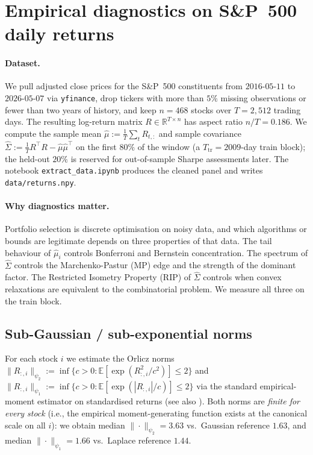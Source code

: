 
\section{Empirical diagnostics on S\&P~500 daily returns}\label{sec:diagnostics}

\paragraph{Dataset.} We pull adjusted close prices for the S\&P~500 constituents from
$2016$-$05$-$11$ to $2026$-$05$-$07$ via \texttt{yfinance}, drop tickers with more than
$5\%$ missing observations or fewer than two years of history, and keep $n=468$ stocks
over $T=2{,}512$ trading days. The resulting log-return matrix $R\in\mathbb R^{T\times n}$ has aspect
ratio $n/T=0.186$. We compute the sample mean $\hat\mu := \tfrac1T\sum_t R_{t,:}$ and
sample covariance $\hat\Sigma := \tfrac1T R^\top R - \hat\mu\hat\mu^\top$ on the first
$80\%$ of the window (a $T_{\mathrm{tr}}=2009$-day train block); the held-out $20\%$ is reserved
for out-of-sample Sharpe assessments later. The notebook \texttt{extract\_data.ipynb} produces
the cleaned panel and writes \texttt{data/returns.npy}.

\paragraph{Why diagnostics matter.} Portfolio selection is discrete optimisation on
noisy data, and which algorithms or bounds are legitimate depends on three properties
of that data. The tail behaviour of $\hat\mu_i$ controls Bonferroni and Bernstein
concentration. The spectrum of $\hat\Sigma$ controls the Marchenko-Pastur (MP) edge and
the strength of the dominant factor. The Restricted Isometry Property (RIP) of
$\hat\Sigma$ controls when convex relaxations are equivalent to the combinatorial
problem. We measure all three on the train block.

\subsection{Sub-Gaussian / sub-exponential norms}\label{ssec:psi}

For each stock $i$ we estimate the Orlicz norms
$\|R_{:,i}\|_{\psi_2} := \inf\{c>0: \mathbb E[\exp(R_{:,i}^2/c^2)]\le 2\}$ and
$\|R_{:,i}\|_{\psi_1} := \inf\{c>0: \mathbb E[\exp(|R_{:,i}|/c)]\le 2\}$ via the standard
empirical-moment estimator on standardised returns \cite[Ch.~2]{vershynin} (see also \cite[Ch.~2]{wainwright}). Both norms are \emph{finite for every
stock} (i.e., the empirical moment-generating function exists at the canonical scale on
all $i$): we obtain median $\|\cdot\|_{\psi_2}=3.63$ vs.\ Gaussian reference $1.63$, and
median $\|\cdot\|_{\psi_1}=1.66$ vs.\ Laplace reference $1.44$.

